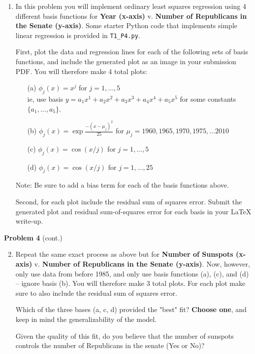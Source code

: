 \documentclass[submit]{harvardml}
\begin{document}
\begin{problem}
\begin{enumerate}
\item In this problem you will implement ordinary least squares regression using 4 different basis functions for
\textbf{Year (x-axis)} v. \textbf{Number of Republicans in the Senate (y-axis)}. Some starter Python code
that implements simple linear regression is provided in \verb|T1_P4.py|.

First, plot the data and regression lines for each of the following sets of basis functions, and include
the generated plot as an image in your submission PDF. You will therefore make 4 total plots:
\begin{enumerate}
	\item[(a)] $\phi_j(x) = x^j$ for $j=1, \ldots, 5$\\
    ie, use basis $y = a_1 x^1 + a_2 x^2 + a_3 x^3 + a_4 x^4 + a_5 x^5$ for some constants $\{a_1, ..., a_5\}$. 
    \item[(b)] $\phi_j(x) = \exp{\frac{-(x-\mu_j)^2}{25}}$ for $\mu_j=1960, 1965, 1970, 1975, \ldots 2010$
	\item[(c)] $\phi_j(x) = \cos(x / j)$ for $j=1, \ldots, 5$
	\item[(d)] $\phi_j(x) = \cos(x / j)$ for $j=1, \ldots, 25$
\end{enumerate}
\vspace{-2mm}
{\footnotesize * Note: Be sure to add a bias term for each of the basis functions above.}

Second, for each plot include the residual sum of squares error. Submit the generated plot and residual sum-of-squares error for each basis in your LaTeX write-up.
\end{enumerate}

\end{problem}

\begin{framed}
\noindent\textbf{Problem 4} (cont.)\\
\begin{enumerate}
\setcounter{enumi}{1}
\item Repeat the same exact process as above but for \textbf{Number of Sunspots (x-axis)} v. \textbf{Number of Republicans in the Senate (y-axis)}. 
Now, however, only use data from before 1985, and only use basis functions (a), (c), and (d) -- ignore basis (b). You will therefore make 3 total plots. For each plot make sure to also include the residual sum of squares error.

Which of the three bases (a, c, d) provided the "best" fit? \textbf{Choose one}, and keep in mind the generalizability of the model. 

Given the quality of this fit, do you believe that the number of sunspots controls the number of Republicans in the senate (Yes or No)?
\end{enumerate}
\end{framed}
\end{document}
